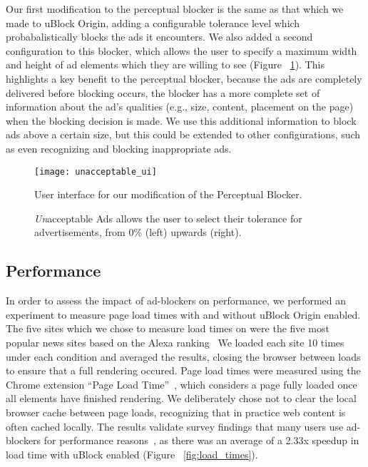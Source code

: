 Our first modification to the perceptual blocker is the same as that which we made to uBlock Origin, adding a configurable tolerance level which probabalistically blocks the ads it encounters.
We also added a second configuration to this blocker, which allows the user to specify a maximum width and height of ad elements which they are willing to see (Figure ~\ref{fig:unacceptable_ui}).
This highlights a key benefit to the perceptual blocker, because the ads are completely delivered before blocking occurs, the blocker has a more complete set of information about the ad's qualities (e.g., size, content, placement on the page) when the blocking decision is made.
We use this additional information to block ads above a certain size, but this could be extended to other configurations, such as even recognizing and blocking inappropriate ads.

\begin{figure}[h]
\centering
\texttt{[image: unacceptable\_ui]}
\caption{User interface for our modification of the Perceptual Blocker.}
\label{fig:unacceptable_ui}
\end{figure}

\begin{figure}[h]
\hfill
{}
\hfill
{}
\hfill
\caption{\textit{Un}acceptable Ads allows the user to select their tolerance for advertisements, from 0\% (left) upwards (right).}
\label{fig:unacceptable}
\end{figure}

\subsection{Performance}
In order to assess the impact of ad-blockers on performance, we performed an experiment to measure page load times with and without uBlock Origin enabled.
The five sites which we chose to measure load times on were the five most popular news sites based on the Alexa ranking~\cite{alexa}
We loaded each site 10 times under each condition and averaged the results, closing the browser between loads to ensure that a full rendering occured.
Page load times were measured using the Chrome extension ``Page Load Time''~\cite{pageloadtime}, which considers a page fully loaded once all elements have finished rendering.
We deliberately chose not to clear the local browser cache between page loads, recognizing that in practice web content is often cached locally.
The results validate survey findings that many users use ad-blockers for performance reasons~\cite{hubspot2016adblock}, as there was an average of a 2.33x speedup in load time with uBlock enabled (Figure ~\ref{fig:load_times}).

